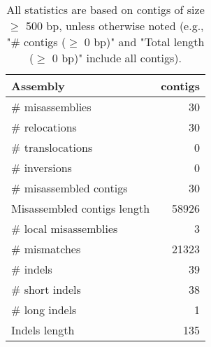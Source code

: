 \documentclass[12pt,a4paper]{article}
\begin{document}
\begin{table}[ht]
\begin{center}
\caption{All statistics are based on contigs of size $\geq$ 500 bp, unless otherwise noted (e.g., "\# contigs ($\geq$ 0 bp)" and "Total length ($\geq$ 0 bp)" include all contigs).}
\begin{tabular}{|l*{1}{|r}|}
\hline
Assembly & contigs \\ \hline
\# misassemblies & 30 \\ \hline
\hspace{5mm}\# relocations & 30 \\ \hline
\hspace{5mm}\# translocations & 0 \\ \hline
\hspace{5mm}\# inversions & 0 \\ \hline
\# misassembled contigs & 30 \\ \hline
Misassembled contigs length & 58926 \\ \hline
\# local misassemblies & 3 \\ \hline
\# mismatches & 21323 \\ \hline
\# indels & 39 \\ \hline
\hspace{5mm}\# short indels & 38 \\ \hline
\hspace{5mm}\# long indels & 1 \\ \hline
Indels length & 135 \\ \hline
\end{tabular}
\end{center}
\end{table}
\end{document}
